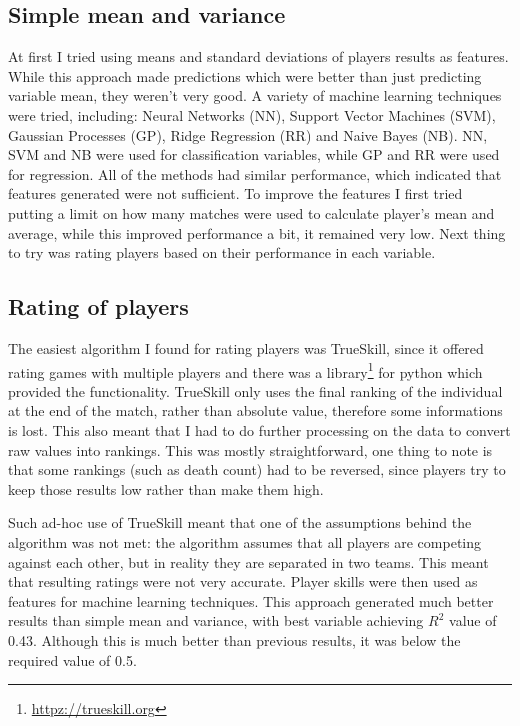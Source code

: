 \documentclass[12pt,a4paper]{book}
\begin{document}
\subsection{Simple mean and variance}
At first I tried using means and standard deviations of players results as features.
While this approach made predictions which were better than just predicting variable mean, they weren't very good.
A variety of machine learning techniques were tried, including: Neural Networks (NN), Support Vector Machines (SVM), Gaussian Processes (GP), Ridge Regression (RR) and Naive Bayes (NB).
NN, SVM and NB were used for classification variables, while GP and RR were used for regression.
All of the methods had similar performance, which indicated that features generated were not sufficient.
To improve the features I first tried putting a limit on how many matches were used to calculate player's mean and average, while this improved performance a bit, it remained very low.
Next thing to try was rating players based on their performance in each variable.

\subsection{Rating of players}
The easiest algorithm I found for rating players was TrueSkill, since it offered rating games with multiple players and there was a library\footnote{\url{httpz://trueskill.org}} for python which provided the functionality.
TrueSkill only uses the final ranking of the individual at the end of the match, rather than absolute value, therefore some informations is lost.
This also meant that I had to do further processing on the data to convert raw values into rankings.
This was mostly straightforward, one thing to note is that some rankings (such as death count) had to be reversed, since players try to keep those results low rather than make them high.

Such ad-hoc use of TrueSkill meant that one of the assumptions behind the algorithm was not met:
the algorithm assumes that all players are competing against each other, but in reality they are separated in two teams.
This meant that resulting ratings were not very accurate.
Player skills were then used as features for machine learning techniques.
This approach generated much better results than simple mean and variance, with best variable achieving $R^2$ value of 0.43.
Although this is much better than previous results, it was below the required value of 0.5.
\end{document}
